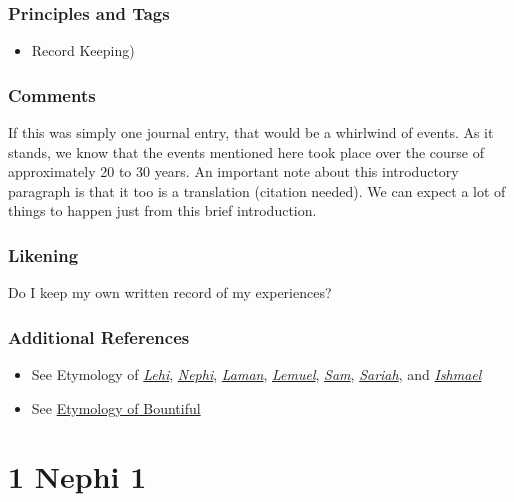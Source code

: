 \documentclass[12pt]{report}
\begin{document}
\subsection{Principles and Tags\label{1Nephi:principles_intro}}
\begin{itemize}
\item {}Record Keeping)
\end{itemize}

\subsection{Comments\label{1Nephi:comments_intro}}
If this was simply one journal entry, that would be a whirlwind of events.  As it stands, we know that the events mentioned here took place over the course of approximately 20 to 30 years.  An important note about this introductory paragraph is that it too is a translation (citation needed).  We can expect a lot of things to happen just from this brief introduction.  

\subsection{Likening\label{1Nephi:likening_intro}}
Do I keep my own written record of my experiences?

\subsection{Additional References\label{1Nephi:references_intro}}
\begin{itemize}
\item See Etymology of \href{https://onoma.lib.byu.edu/index.php/LEHI}{\emph{Lehi}}, \href{https://onoma.lib.byu.edu/index.php/NEPHI}{\emph{Nephi}}, \href{https://onoma.lib.byu.edu/index.php/LAMAN}{\emph{Laman}}, \href{https://onoma.lib.byu.edu/index.php/LEMUEL}{\emph{Lemuel}}, \href{https://onoma.lib.byu.edu/index.php/SAM}{\emph{Sam}}, \href{https://onoma.lib.byu.edu/index.php/SARIAH}{\emph{Sariah}}, and \href{https://onoma.lib.byu.edu/index.php/ISHMAEL}{\emph{Ishmael}}
\item See \href{https://onoma.lib.byu.edu/index.php/BOUNTIFUL}{Etymology of Bountiful}
\end{itemize}
\chapter{1 Nephi 1\label{1Nephi1}}
\end{document}
